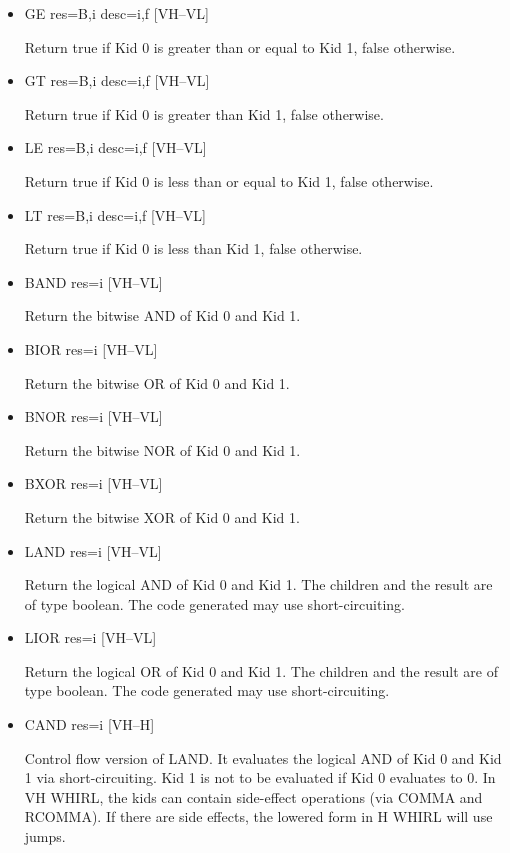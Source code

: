 \begin{itemize}
%
\item  GE res=B,i desc=i,f \hfill [VH--VL]

Return true if Kid 0 is greater than or equal to Kid 1, false
otherwise.

\item
{}%
GT res=B,i desc=i,f \hfill [VH--VL]

Return true if Kid 0 is greater than Kid 1, false otherwise.

\item
{}%
LE res=B,i desc=i,f \hfill [VH--VL]

Return true if Kid 0 is less than or equal to Kid 1, false otherwise.

\item
{}%
LT res=B,i desc=i,f \hfill [VH--VL]

Return true if Kid 0 is less than Kid 1, false otherwise.

\item
{}%
BAND res=i \hfill [VH--VL]

Return the bitwise AND of Kid 0 and Kid 1.

\item
{}%
BIOR res=i \hfill [VH--VL]

Return the bitwise OR of Kid 0 and Kid 1.

\item
{}%
BNOR res=i \hfill [VH--VL]

Return the bitwise NOR of Kid 0 and Kid 1.

\item
{}%
BXOR res=i \hfill [VH--VL]

Return the bitwise XOR of Kid 0 and Kid 1.

\item
{}%
LAND res=i \hfill [VH--VL]

Return the logical AND of Kid 0 and Kid 1. The children and the
result are of type boolean. The code generated may use short-circuiting.

\item
{}%
LIOR res=i \hfill [VH--VL]

Return the logical OR of Kid 0 and Kid 1. The children and the
result are of type boolean. The code generated may use short-circuiting.

\item
{}%
CAND res=i \hfill [VH--H]

Control flow version of
%
LAND. It evaluates the logical AND of Kid
0 and Kid 1 via short-circuiting. Kid 1 is not to be evaluated if
Kid 0 evaluates to 0. In VH WHIRL, the kids can contain side-effect operations
(via
%
COMMA and
%
RCOMMA). If there are side effects, the lowered form
in H WHIRL will use jumps.


\end{itemize}
